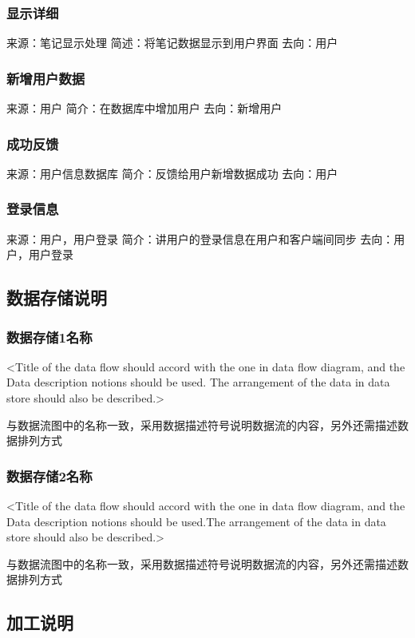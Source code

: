 \subsubsection{显示详细}
来源：笔记显示处理
简述：将笔记数据显示到用户界面
去向：用户

\subsubsection{新增用户数据}
来源：用户
简介：在数据库中增加用户
去向：新增用户

\subsubsection{成功反馈}
来源：用户信息数据库
简介：反馈给用户新增数据成功
去向：用户

\subsubsection{登录信息}
来源：用户，用户登录
简介：讲用户的登录信息在用户和客户端间同步
去向：用户，用户登录


\subsection{数据存储说明}
\subsubsection{数据存储1名称}
<Title of  the data flow should accord with the one in data flow diagram, and the Data description notions should be used. The arrangement of the data in data store should also be described.>

与数据流图中的名称一致，采用数据描述符号说明数据流的内容，另外还需描述数据排列方式

\subsubsection{数据存储2名称}
<Title of  the data flow should accord with the one in data flow diagram, and the Data description notions should be used.The arrangement of the data in data store should also be described.>

与数据流图中的名称一致，采用数据描述符号说明数据流的内容，另外还需描述数据排列方式

\subsection{加工说明}
